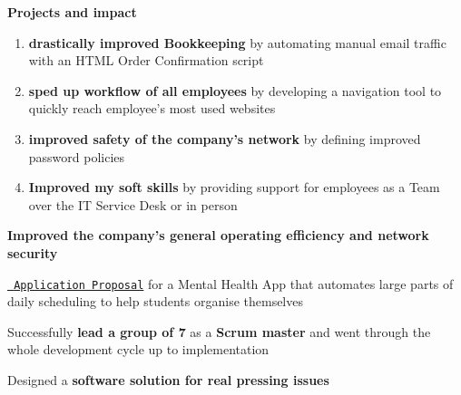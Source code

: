 \documentclass[]{jonas-cv}
\begin{document}
\begin{minipage}[t]{0.63\textwidth} 


\tinysectionsep
{}
\sectionsep

\begin{tightemize}
    \item \textbf{Projects and impact}
    \begin{enumerate}
        \item \textbf{drastically improved Bookkeeping} by automating manual email traffic with an HTML Order Confirmation script
        \item \textbf{sped up workflow of all employees} by developing a navigation tool to quickly reach employee's most used websites
        \item \textbf{improved safety of the company's network} by defining improved password policies
        \item \textbf{Improved my soft skills} by providing support for employees as a Team over the IT Service Desk or in person
    \end{enumerate}
    \vspace{1mm}

    \item [\faicon{angle-double-right}] \textbf{Improved the company's general operating efficiency and network security}
\end{tightemize}
\largesectionsep

\vspace{-1mm}
\tinysectionsep
{}
\begin{tightemize}
    \item \href{https://github.com/j0ner0n/mobile-scheduling-app/blob/master/final-doc/software-engineering-g21.pdf}{\texttt{ Application Proposal}} for a Mental Health App that automates large parts of daily scheduling to help students organise themselves
    \item[\faicon{angle-double-right}] Successfully \textbf{lead a group of 7} as a \textbf{Scrum master} and went through the whole development cycle up to implementation
    \item[\faicon{angle-double-right}] Designed a \textbf{software solution for real pressing issues} 
\end{tightemize}
\largesectionsep



\end{minipage}
\end{document}
